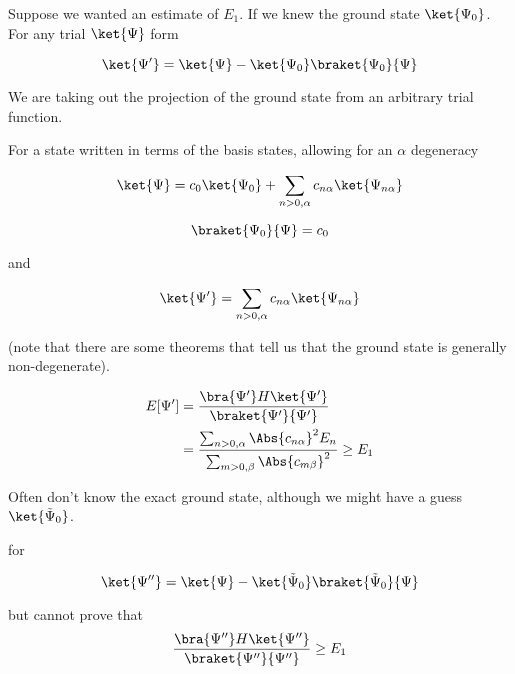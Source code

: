 Suppose we wanted an estimate of $E_1$.  If we knew the ground state $\ket{\Psi_0}$.  For any trial $\ket{\Psi}$ form

\begin{equation}\label{eqn:qmTwoL3:170}
\ket{\Psi'} = 
\ket{\Psi} - 
\ket{\Psi_0}  \braket{\Psi_0}{\Psi}
\end{equation}

We are taking out the projection of the ground state from an arbitrary trial function.

For a state written in terms of the basis states, allowing for an $\alpha$ degeneracy

\begin{equation}\label{eqn:qmTwoL3:190}
\ket{\Psi} = 
c_0 \ket{\Psi_0}  
+
\sum_{n> 0, \alpha} c_{n \alpha} \ket{\Psi_{n \alpha}}
\end{equation}

\begin{equation}\label{eqn:qmTwoL3:210}
\braket{\Psi_0}{\Psi} = 
c_0 
\end{equation}

and

\begin{equation}\label{eqn:qmTwoL3:230}
\ket{\Psi'} = 
\sum_{n> 0, \alpha} c_{n \alpha} \ket{\Psi_{n \alpha}}
\end{equation}

(note that there are some theorems that tell us that the ground state is generally non-degenerate).

\begin{align*}
E[\Psi'] 
&= 
\frac{
\bra{\Psi'} H \ket{\Psi'}
}
{
\braket{\Psi'}{\Psi'}
}  \\
&=
\frac{
\sum_{n> 0, \alpha} \Abs{c_{n \alpha}}^2 E_n
}
{
\sum_{m> 0, \beta} \Abs{c_{m \beta}}^2 
}
\ge E_1
\end{align*}

Often don't know the exact ground state, although we might have a guess $\ket{\tilde{\Psi}_0}$.

for

\begin{equation}\label{eqn:qmTwoL3:250}
\ket{\Psi''} = \ket{\Psi} - 
\ket{\tilde{\Psi}_0}
\braket{\tilde{\Psi}_0}{\Psi}
\end{equation}

but cannot prove that
\begin{equation}\label{eqn:qmTwoL3:270}
\frac{
\bra{\Psi''} H \ket{\Psi''}
}
{
\braket{\Psi''}{\Psi''}
} 
\ge E_1
\end{equation}

